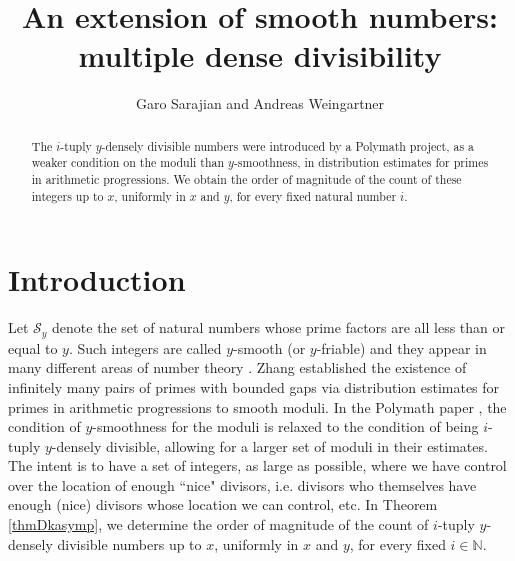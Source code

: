 \documentclass[11pt]{amsart}
\begin{document}
\title[Multiple dense divisibility]{An extension of smooth numbers: \\ multiple dense divisibility}

\author{Garo Sarajian and Andreas Weingartner} 
\address{Department of Mathematical Sciences, United States Military Academy, 601 Cullum Road, West Point, New York, 10996, USA}
\address{Department of Mathematics, Southern Utah University, 351 West University Boulevard, Cedar City, Utah 84720, USA} 

\maketitle

\begin{abstract}
The $i$-tuply $y$-densely divisible numbers were introduced by a Polymath project, as a weaker condition on the moduli than $y$-smoothness, 
in distribution estimates for primes in arithmetic progressions. 
We obtain the order of magnitude of the count of these integers up to $x$, uniformly in $x$ and $y$, for every fixed natural number $i$.
\end{abstract}

\section{Introduction}

Let $\mathcal{S}_y$ denote the set of natural numbers whose prime factors are all less than or equal to $y$. 
Such integers are called $y$-smooth (or $y$-friable) and they appear in many different areas of number theory \cite{Gran, HilTen, Pom}. 
Zhang \cite{Zhang} established the existence of infinitely many pairs of primes with bounded gaps 
via distribution estimates for primes in arithmetic progressions to smooth moduli.
In the Polymath paper \cite{Poly}, the condition of $y$-smoothness for the moduli 
is relaxed to the condition of being $i$-tuply $y$-densely divisible, allowing for a larger set of moduli in their estimates. 
The intent is to have a set of integers, as large as possible, where we have control over the location of enough ``nice" divisors, 
i.e. divisors who themselves have enough (nice) divisors whose location we can control, etc. 
In Theorem \ref{thmDkasymp}, we determine the order of magnitude of the count of $i$-tuply $y$-densely divisible numbers up to $x$, uniformly in $x$ and $y$, for every fixed $i \in \mathbb{N}$.
\end{document}
